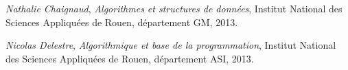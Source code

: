 \documentclass[a4paper, titlepage]{livret} %
\begin{document}
	\appendix

	

	

	
	
	
	
	
	
	\begin{thebibliography}{9}
	
			\emph{Nathalie Chaignaud},
			\textit{Algorithmes et structures de données},
			Institut National des Sciences Appliquées de Rouen, département GM, 2013.

			\emph{Nicolas Delestre},
			\textit{Algorithmique et base de la programmation},
			Institut National des Sciences Appliquées de Rouen, département ASI, 2013.
	
	\end{thebibliography}
\end{document}
